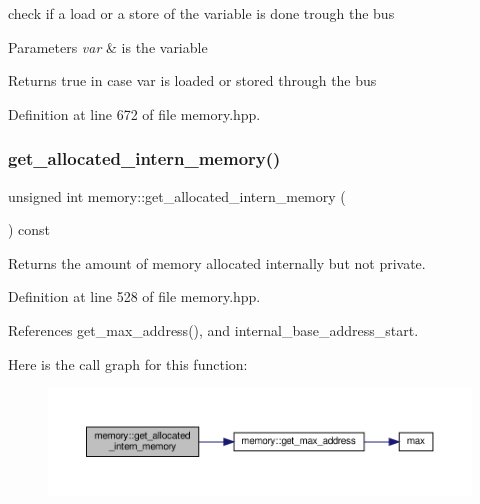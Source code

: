 check if a load or a store of the variable is done trough the bus 


\begin{DoxyParams}{Parameters}
{\em var} & is the variable \\
\hline
\end{DoxyParams}
\begin{DoxyReturn}{Returns}
true in case var is loaded or stored through the bus 
\end{DoxyReturn}


Definition at line 672 of file memory.\+hpp.

\mbox{\label{classmemory_a779906886ca81a3ed86aaa2b3c69d4f0}} 
\subsubsection{\texorpdfstring{get\+\_\+allocated\+\_\+intern\+\_\+memory()}{get\_allocated\_intern\_memory()}}
{\footnotesize\ttfamily unsigned int memory\+::get\+\_\+allocated\+\_\+intern\+\_\+memory (\begin{DoxyParamCaption}{ }\end{DoxyParamCaption}) const\hspace{0.3cm}{\ttfamily [inline]}}



Returns the amount of memory allocated internally but not private. 



Definition at line 528 of file memory.\+hpp.



References get\+\_\+max\+\_\+address(), and internal\+\_\+base\+\_\+address\+\_\+start.

Here is the call graph for this function\+:
\nopagebreak
\begin{figure}[H]
\begin{center}
\leavevmode
\includegraphics[width=350pt]{d8/d99/classmemory_a779906886ca81a3ed86aaa2b3c69d4f0_cgraph}
\end{center}
\end{figure}
\mbox{\label{classmemory_a580103df3eb36abe6d53f31b7fba7fed}} 
